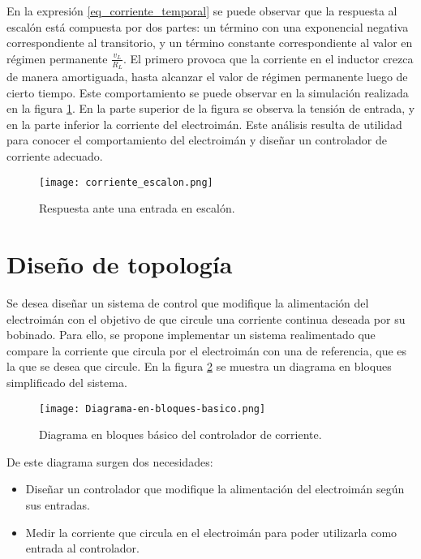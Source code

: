 En la expresión \ref{eq_corriente_temporal} se puede observar que la respuesta al escalón está compuesta por dos partes: un término con una exponencial negativa correspondiente al transitorio, y un término constante correspondiente al valor en régimen permanente $\frac{v_L}{R_L}$. El primero provoca que la corriente en el inductor crezca de manera amortiguada, hasta alcanzar el valor de régimen permanente luego de cierto tiempo. Este comportamiento se puede observar en la simulación realizada en la figura \ref{fig:img_respuesta_escalon}. En la parte superior de la figura se observa la tensión de entrada, y en la parte inferior la corriente del electroimán. Este análisis resulta de utilidad para conocer el comportamiento del electroimán y diseñar un controlador de corriente adecuado.


\begin{figure}[H]
	\centering
	\texttt{[image: corriente\_escalon.png]}
	\caption{Respuesta ante una entrada en escalón.}
	\label{fig:img_respuesta_escalon}
\end{figure}


\section{Diseño de topología}


Se desea diseñar un sistema de control que modifique la alimentación del electroimán con el objetivo de que circule una corriente continua deseada por su bobinado.  Para ello, se propone implementar un sistema realimentado que compare la corriente que circula por el electroimán con una de referencia, que es la que se desea que circule. En la figura \ref{fig:img_diagrama_bloques_basico} se muestra un diagrama en bloques simplificado del sistema.

\begin{figure}[H]
	\centering
	\texttt{[image: Diagrama-en-bloques-basico.png]}
	\caption{Diagrama en bloques básico del controlador de corriente.}
	\label{fig:img_diagrama_bloques_basico}
\end{figure}

De este diagrama surgen dos necesidades:
\begin{itemize}
	\item Diseñar un controlador que modifique la alimentación del electroimán según sus entradas.
	\item Medir la corriente que circula en el electroimán para poder utilizarla como entrada al controlador.
\end{itemize}

